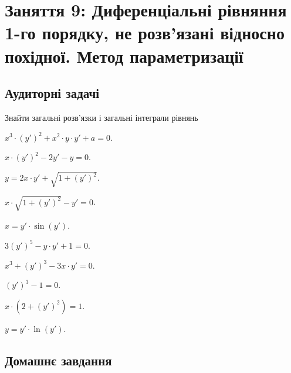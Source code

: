 \section*{Заняття 9: Диференціальні рівняння 1-го порядку, не розв'язані відносно похідної. Метод параметризації}

\subsection*{Аудиторні задачі}

Знайти загальні розв'язки і загальні інтеграли рівнянь

\begin{problem}
	$x^3 \cdot (y')^2 + x^2 \cdot y \cdot y' + a = 0$.
\end{problem}

\begin{problem}
	$x \cdot (y')^2 - 2 y' - y = 0$.
\end{problem}

\begin{problem}
	$y = 2 x \cdot y' + \sqrt{1 + (y')^2}$.
\end{problem}

\begin{problem}
	$x \cdot \sqrt{1 + (y')^2} - y' = 0$.
\end{problem}

\begin{problem}
	$x = y' \cdot \sin (y')$.
\end{problem}

\begin{problem}
	$3 (y')^5 - y \cdot y' + 1 = 0$.
\end{problem}

\begin{problem}
	$x^3 + (y')^3 - 3 x \cdot y' = 0$.
\end{problem}

\begin{problem}
	$(y')^3 - 1 = 0$.
\end{problem}

\begin{problem}
	$x \cdot (2 + (y')^2) = 1$.
\end{problem}

\begin{problem}
	$y = y' \cdot \ln (y')$.
\end{problem}

\subsection*{Домашнє завдання}


